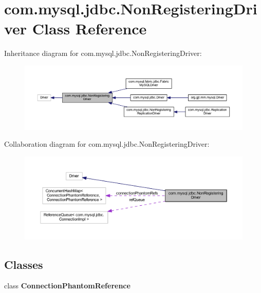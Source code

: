 \hypertarget{classcom_1_1mysql_1_1jdbc_1_1_non_registering_driver}{}\section{com.\+mysql.\+jdbc.\+Non\+Registering\+Driver Class Reference}
\label{classcom_1_1mysql_1_1jdbc_1_1_non_registering_driver}


Inheritance diagram for com.\+mysql.\+jdbc.\+Non\+Registering\+Driver\+:
\nopagebreak
\begin{figure}[H]
\begin{center}
\leavevmode
\includegraphics[width=350pt]{classcom_1_1mysql_1_1jdbc_1_1_non_registering_driver__inherit__graph}
\end{center}
\end{figure}


Collaboration diagram for com.\+mysql.\+jdbc.\+Non\+Registering\+Driver\+:
\nopagebreak
\begin{figure}[H]
\begin{center}
\leavevmode
\includegraphics[width=350pt]{classcom_1_1mysql_1_1jdbc_1_1_non_registering_driver__coll__graph}
\end{center}
\end{figure}
\subsection*{Classes}
\begin{DoxyCompactItemize}
\item 
class {\bfseries Connection\+Phantom\+Reference}
\end{DoxyCompactItemize}

